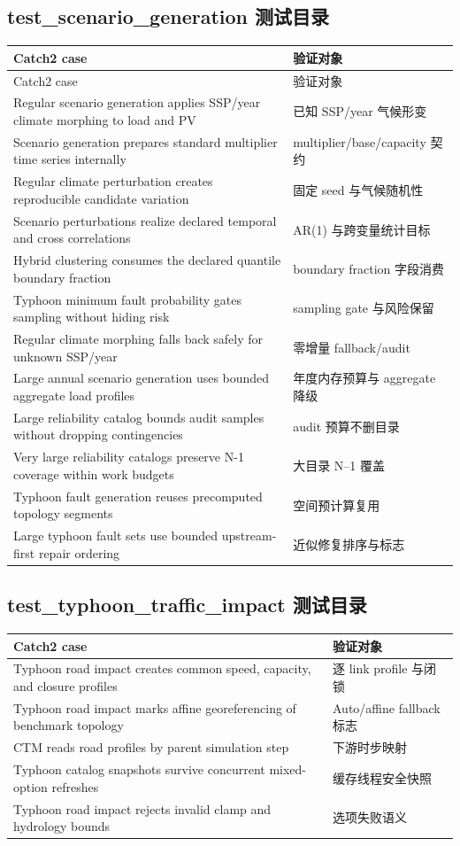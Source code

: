 \subsection{test\_scenario\_generation 测试目录}
\begin{longtable}{@{}L{8.0cm}L{6.0cm}@{}}
\toprule
Catch2 case & 验证对象\\
\midrule\endfirsthead
\toprule Catch2 case & 验证对象\\\midrule\endhead
Regular scenario generation applies SSP/year climate morphing to load and PV & 已知 SSP/year 气候形变\\
Scenario generation prepares standard multiplier time series internally & multiplier/base/capacity 契约\\
Regular climate perturbation creates reproducible candidate variation & 固定 seed 与气候随机性\\
Scenario perturbations realize declared temporal and cross correlations & AR(1) 与跨变量统计目标\\
Hybrid clustering consumes the declared quantile boundary fraction & boundary fraction 字段消费\\
Typhoon minimum fault probability gates sampling without hiding risk & sampling gate 与风险保留\\
Regular climate morphing falls back safely for unknown SSP/year & 零增量 fallback/audit\\
Large annual scenario generation uses bounded aggregate load profiles & 年度内存预算与 aggregate 降级\\
Large reliability catalog bounds audit samples without dropping contingencies & audit 预算不删目录\\
Very large reliability catalogs preserve N-1 coverage within work budgets & 大目录 N--1 覆盖\\
Typhoon fault generation reuses precomputed topology segments & 空间预计算复用\\
Large typhoon fault sets use bounded upstream-first repair ordering & 近似修复排序与标志\\
\bottomrule
\end{longtable}

\subsection{test\_typhoon\_traffic\_impact 测试目录}
\begin{longtable}{@{}L{8.0cm}L{6.0cm}@{}}
\toprule
Catch2 case & 验证对象\\
\midrule\endfirsthead
Typhoon road impact creates common speed, capacity, and closure profiles & 逐 link profile 与闭锁\\
Typhoon road impact marks affine georeferencing of benchmark topology & Auto/affine fallback 标志\\
CTM reads road profiles by parent simulation step & 下游时步映射\\
Typhoon catalog snapshots survive concurrent mixed-option refreshes & 缓存线程安全快照\\
Typhoon road impact rejects invalid clamp and hydrology bounds & 选项失败语义\\
\bottomrule
\end{longtable}


